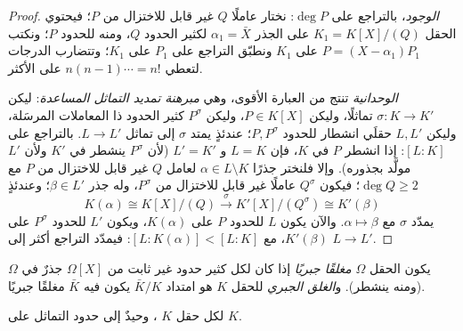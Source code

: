 \begin{proof}
\emph{الوجود}، بالتراجع على $\deg P$: نختار عاملًا $Q$ غير قابل
للاختزال من $P$؛ فيحتوي الحقل $K_1 = K[X]/(Q)$ على الجذر $\alpha_1 = \bar X$
لكثير الحدود $Q$، ومنه للحدود $P$؛ ونكتب $P = (X -
\alpha_1)P_1$ على $K_1$ ونطبّق التراجع على
$P_1$ على $K_1$؛ وتتضارب الدرجات لتعطي $n(n-1)\cdots = n!$ على الأكثر.

\emph{الوحدانية} تنتج من العبارة الأقوى، وهي \emph{مبرهنة تمديد
التماثل المساعدة}: ليكن $\sigma \colon K \to K'$ تماثلًا، وليكن $P \in K[X]$،
وليكن $P^\sigma$ كثير الحدود ذا المعاملات المرسَلة، وليكن
$L, L'$ حقلَي انشطار للحدود $P, P^\sigma$؛ عندئذٍ يمتد $\sigma$
إلى تماثل $L \to L'$. بالتراجع على $[L:K]$: إذا انشطر $P$ في
$K$، فإن $L = K$ و $L' = K'$ (لأن $P^\sigma$ ينشطر في $K'$ ولأن
$L'$ مولَّد بجذوره). وإلا فلنختر جذرًا $\alpha \in L \setminus K$ لعامل $Q$ غير قابل
للاختزال من $P$ مع $\deg Q \geq 2$؛ فيكون $Q^\sigma$ عاملًا غير
قابل للاختزال من $P^\sigma$، وله جذر $\beta \in L'$؛ وعندئذٍ
\[
K(\alpha) \cong K[X]/(Q) \xrightarrow{\ \sigma\ }
K'[X]/(Q^\sigma) \cong K'(\beta)
\]
يمدّد $\sigma$ مع $\alpha \mapsto \beta$. والآن يكون $L$  للحدود $P$ على
$K(\alpha)$، ويكون $L'$  للحدود $P^\sigma$ على
$K'(\beta)$، مع $[L : K(\alpha)] < [L:K]$: فيمدّد التراجع أكثر إلى $L \to L'$.
\end{proof}

\begin{definition}\label{def:b3:galois:closure}
يكون الحقل $\Omega$ \emph{مغلقًا جبريًا}
إذا كان لكل كثير حدود غير ثابت من $\Omega[X]$ جذرٌ في $\Omega$
(ومنه ينشطر). و\emph{الغلق الجبري} للحقل $K$ هو
امتداد  $\bar K/K$ يكون فيه $\bar K$ مغلقًا جبريًا.
\end{definition}

\begin{theorem}[شتاينيتز]\label{thm:b3:galois:steinitz}
لكل حقل $K$ ، وحيدٌ إلى حدود التماثل على $K$.
\end{theorem}

